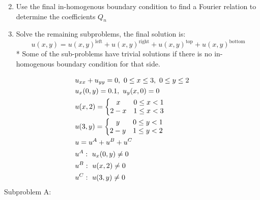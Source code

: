 \documentclass[11pt, fleqn]{article}
\begin{document}
\begin{enumerate}
\begin{tcolorbox}
\begin{multicols}{2}
\end{multicols}
\end{tcolorbox}

    \item Use the final in-homogenous boundary condition to find a Fourier relation to determine the coefficients $Q_n$
    
    \item Solve the remaining subproblems, the final solution is:
    $$u(x,y) = u(x,y)^{\text{left}} + u(x,y)^{\text{right}} + u(x,y)^{\text{top}} + u(x,y)^{\text{bottom}}$$
    * Some of the sub-problems have trivial solutions if there is no in-homogenous boundary condition for that side.

\end{enumerate}
\begin{align*}
    &u_{xx}+u_{yy}=0,\ 0\leq x\leq 3,\ 0\leq y\leq 2\\
    &u_x(0,y)=0.1,\ u_y(x,0)=0\\
    &u(x,2)=\left\{\begin{matrix} x & 0\leq x<1\\ 2-x & 1\leq x <3 \end{matrix}\right.\\
    &u(3,y)=\left\{\begin{matrix} y & 0\leq y<1\\ 2-y & 1\leq y <2 \end{matrix}\right.\\
    &u=u^A+u^B+u^C\\
    &u^A:\ u_x(0,y)\neq0\\
    &u^B:\ u(x,2)\neq0\\
    &u^C:\ u(3,y)\neq0
\end{align*}
Subproblem A:
\end{document}
